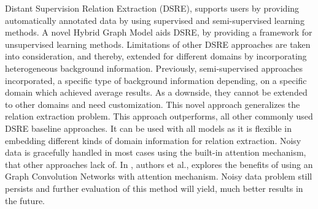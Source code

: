 \noindent

Distant Supervision Relation Extraction (DSRE), supports users by providing automatically annotated data by using supervised and semi-supervised learning methods. A novel Hybrid Graph Model aids DSRE, by providing a framework for unsupervised learning methods. Limitations of other DSRE approaches are taken into consideration, and thereby, extended for different domains by incorporating heterogeneous background information. Previously, semi-supervised approaches incorporated, a specific type of background information depending, on a specific domain which achieved average results. As a downside, they cannot be extended to other domains and need customization. This novel approach generalizes the relation extraction problem. This approach outperforms, all other commonly used DSRE baseline approaches. It can be used with all models as it is flexible in embedding different kinds of domain information for relation extraction. Noisy data is gracefully handled in most cases using the built-in attention mechanism, that other approaches lack of. In , authors  et al., explores the benefits of using an Graph Convolution Networks with attention mechanism. Noisy data problem still persists and further evaluation of this method will yield, much better results in the future.